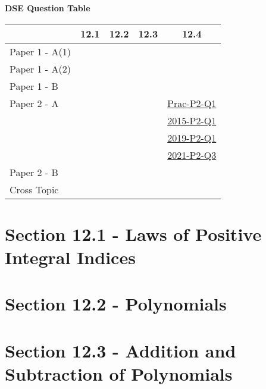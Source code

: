 \documentclass[12pt, a4paper]{article}
\begin{document}
\begin{absolutelynopagebreak}
\begin{center}
\textbf{DSE Question Table}
\end{center}
\begin{center}
\begin{tabular}{|l|c|c|c|c|}
\hline
        & 12.1 & 12.2 & 12.3 & 12.4 \\\hline
\hline
Paper 1 - A(1)&  &  &  &  \\
\hline
Paper 1 - A(2)&  &  &  &  \\
\hline
Paper 1 - B&  &  &  &  \\
\hline
\hline
Paper 2 - A&  &  &  & \hyperref[DSE2012P-CoreP2-Q01]{Prac-P2-Q1} \\
&  &  &  & \hyperref[DSE2015-CoreP2-Q01]{2015-P2-Q1} \\
&  &  &  & \hyperref[DSE2019-CoreP2-Q01]{2019-P2-Q1} \\
&  &  &  & \hyperref[DSE2021-CoreP2-Q03]{2021-P2-Q3} \\
\hline
Paper 2 - B&  &  &  &  \\
\hline
\hline
Cross Topic&  &  &  &  \\
\hline
\end{tabular}
\end{center}
\end{absolutelynopagebreak}




\section*{Section 12.1 - Laws of Positive Integral Indices}\label{section:1-12-1}





\section*{Section 12.2 - Polynomials}\label{section:1-12-2}





\section*{Section 12.3 - Addition and Subtraction of Polynomials}\label{section:1-12-3}
\end{document}
